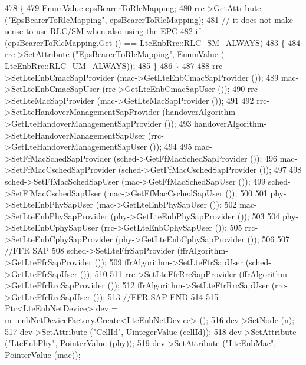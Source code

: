 \begin{DoxyCode}
478     \{
479       EnumValue epsBearerToRlcMapping;
480       rrc->GetAttribute (\textcolor{stringliteral}{"EpsBearerToRlcMapping"}, epsBearerToRlcMapping);
481       \textcolor{comment}{// it does not make sense to use RLC/SM when also using the EPC}
482       \textcolor{keywordflow}{if} (epsBearerToRlcMapping.Get () == \hyperlink{classns3_1_1LteEnbRrc_a1c748bf2d69860b866dfda2a38427842aacda149c15c085eb654d411b64f62770}{LteEnbRrc::RLC\_SM\_ALWAYS})
483         \{
484           rrc->SetAttribute (\textcolor{stringliteral}{"EpsBearerToRlcMapping"}, EnumValue (
      \hyperlink{classns3_1_1LteEnbRrc_a1c748bf2d69860b866dfda2a38427842acde4cbe52f3092f0b832b8c540329332}{LteEnbRrc::RLC\_UM\_ALWAYS}));
485         \}
486     \}
487 
488   rrc->SetLteEnbCmacSapProvider (mac->GetLteEnbCmacSapProvider ());
489   mac->SetLteEnbCmacSapUser (rrc->GetLteEnbCmacSapUser ());
490   rrc->SetLteMacSapProvider (mac->GetLteMacSapProvider ());
491 
492   rrc->SetLteHandoverManagementSapProvider (handoverAlgorithm->GetLteHandoverManagementSapProvider ());
493   handoverAlgorithm->SetLteHandoverManagementSapUser (rrc->GetLteHandoverManagementSapUser ());
494 
495   mac->SetFfMacSchedSapProvider (sched->GetFfMacSchedSapProvider ());
496   mac->SetFfMacCschedSapProvider (sched->GetFfMacCschedSapProvider ());
497 
498   sched->SetFfMacSchedSapUser (mac->GetFfMacSchedSapUser ());
499   sched->SetFfMacCschedSapUser (mac->GetFfMacCschedSapUser ());
500 
501   phy->SetLteEnbPhySapUser (mac->GetLteEnbPhySapUser ());
502   mac->SetLteEnbPhySapProvider (phy->GetLteEnbPhySapProvider ());
503 
504   phy->SetLteEnbCphySapUser (rrc->GetLteEnbCphySapUser ());
505   rrc->SetLteEnbCphySapProvider (phy->GetLteEnbCphySapProvider ());
506 
507   \textcolor{comment}{//FFR SAP}
508   sched->SetLteFfrSapProvider (ffrAlgorithm->GetLteFfrSapProvider ());
509   ffrAlgorithm->SetLteFfrSapUser (sched->GetLteFfrSapUser ());
510 
511   rrc->SetLteFfrRrcSapProvider (ffrAlgorithm->GetLteFfrRrcSapProvider ());
512   ffrAlgorithm->SetLteFfrRrcSapUser (rrc->GetLteFfrRrcSapUser ());
513   \textcolor{comment}{//FFR SAP END}
514 
515   Ptr<LteEnbNetDevice> dev = \hyperlink{classns3_1_1LteHelper_a9c0c99089bff0702be00c782cb1f0aa6}{m\_enbNetDeviceFactory}.\hyperlink{classns3_1_1ObjectFactory_a18152e93f0a6fe184ed7300cb31e9896}{Create}<LteEnbNetDevice> ();
516   dev->SetNode (n);
517   dev->SetAttribute (\textcolor{stringliteral}{"CellId"}, UintegerValue (cellId)); 
518   dev->SetAttribute (\textcolor{stringliteral}{"LteEnbPhy"}, PointerValue (phy));
519   dev->SetAttribute (\textcolor{stringliteral}{"LteEnbMac"}, PointerValue (mac));

\end{DoxyCode}
